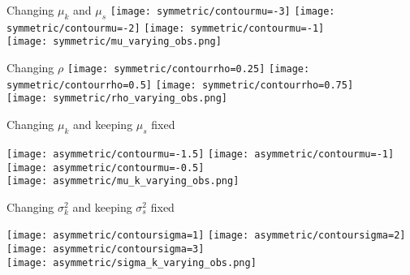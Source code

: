 \documentclass{beamer}
\begin{document}
	\begin{frame}{\small Changing $\mu_k$ and $\mu_s$}
		\texttt{[image: symmetric/contourmu=-3]}\hfill
		\texttt{[image: symmetric/contourmu=-2]}\hfill
		\texttt{[image: symmetric/contourmu=-1]}\\
		\centering
		\texttt{[image: symmetric/mu\_varying\_obs.png]}
	\end{frame}
	
	\begin{frame}{\small Changing $\rho$}
		\texttt{[image: symmetric/contourrho=0.25]}\hfill
		\texttt{[image: symmetric/contourrho=0.5]}\hfill
		\texttt{[image: symmetric/contourrho=0.75]}\\
		\centering
		\texttt{[image: symmetric/rho\_varying\_obs.png]}
	\end{frame}
	
		\begin{frame}{\small Changing $\mu_k$ and keeping $\mu_s$ fixed}
		
		\texttt{[image: asymmetric/contourmu=-1.5]}\hfill
		\texttt{[image: asymmetric/contourmu=-1]}\hfill
		\texttt{[image: asymmetric/contourmu=-0.5]}\\
		\centering
		\texttt{[image: asymmetric/mu\_k\_varying\_obs.png]}
	\end{frame}
	
			\begin{frame}{\small Changing $\sigma^2_k$ and keeping $\sigma^2_s$ fixed}
		
		\texttt{[image: asymmetric/contoursigma=1]}\hfill
		\texttt{[image: asymmetric/contoursigma=2]}\hfill
		\texttt{[image: asymmetric/contoursigma=3]}\\
		\centering
		\texttt{[image: asymmetric/sigma\_k\_varying\_obs.png]}
	\end{frame}
	
	
	
	
	
\end{document}
